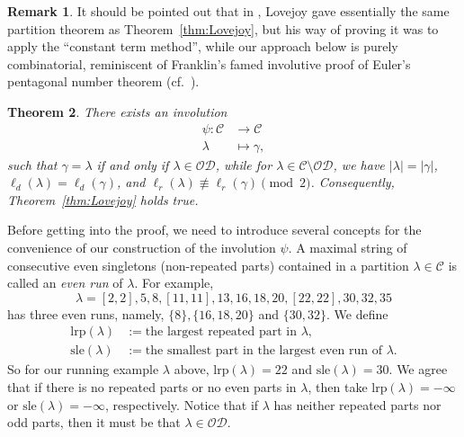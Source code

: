 \documentclass[11pt,reqno]{amsart}
\numberwithin{equation}{section}
\theoremstyle{plain}
\newtheorem{theorem}{Theorem}[section]
\theoremstyle{definition}
\newtheorem{remark}[theorem]{Remark}
\def\la{\lambda}
\def\C{\mathcal{C}}
\def\O{\mathcal{O}}
\def\gam{\gamma}
\newcommand{\D}{\mathcal{D}}
\def\lrp{\mathrm{lrp}}
\def\sle{\mathrm{sle}}
\begin{document}
\begin{remark}
It should be pointed out that in \cite[Thm.~1.9]{lov06}, Lovejoy gave essentially the same partition theorem as Theorem~\ref{thm:Lovejoy}, but his way of proving it was to apply the ``constant term method'', while our approach below is purely combinatorial, reminiscent of Franklin's famed involutive proof of Euler's pentagonal number theorem (cf.~\cite[Thm.~1.6]{andtp}).
\end{remark}

 















\begin{theorem}\label{thm:Franklin invo}
There exists an involution
\begin{align*}
\psi: \C &\to \C\\
\la &\mapsto \gam,
\end{align*}
such that $\gamma=\la$ if and only if $\la\in\O\D$, while for $\la\in\C\setminus \O\D$, we have $|\la|=|\gam|$, $\ell_d(\la)=\ell_d(\gamma)$, and $\ell_r(\la)\not\equiv\ell_r(\gamma)\pmod 2$. Consequently, Theorem~\ref{thm:Lovejoy} holds true.
\end{theorem}

Before getting into the proof, we need to introduce several concepts for the convenience of our construction of the involution $\psi$. A maximal string of consecutive even singletons (non-repeated parts) contained in a partition $\la\in \C$ is called an {\it even run} of $\lambda$. For example,
$$
\lambda=[2, 2], 5, 8, [11, 11], 13, 16, 18, 20, [22,22], 30, 32, 35
$$
has three even runs, namely, $\{8\}, \{16 ,18, 20\}$ and $\{30, 32\}$. We define 
\begin{align*}
\lrp(\la) &:=\text{the largest repeated part in $\la$},\\
\sle(\la) &:=\text{the smallest part in the largest even run of $\la$}.
\end{align*}
So for our running example $\la$ above, $\lrp(\la)=22$ and $\sle(\la)=30$. We agree that if there is no repeated parts or no even parts in $\la$, then take $\lrp(\la)=-\infty$ or $\sle(\la)=-\infty$, respectively. Notice that if $\la$ has neither repeated parts nor odd parts, then it must be that $\la\in \O\D$.
\end{document}
